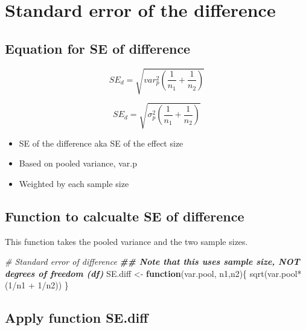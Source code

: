 \documentclass[
]{book}
\newenvironment{Shaded}{\begin{snugshade}}{\end{snugshade}}
\newcommand{\CommentTok}[1]{\textcolor[rgb]{0.56,0.35,0.01}{\textit{#1}}}
\newcommand{\ControlFlowTok}[1]{\textcolor[rgb]{0.13,0.29,0.53}{\textbf{#1}}}
\newcommand{\DecValTok}[1]{\textcolor[rgb]{0.00,0.00,0.81}{#1}}
\newcommand{\DocumentationTok}[1]{\textcolor[rgb]{0.56,0.35,0.01}{\textbf{\textit{#1}}}}
\newcommand{\FunctionTok}[1]{\textcolor[rgb]{0.00,0.00,0.00}{#1}}
\newcommand{\NormalTok}[1]{#1}
\newcommand{\OtherTok}[1]{\textcolor[rgb]{0.56,0.35,0.01}{#1}}
\newcommand{\SpecialCharTok}[1]{\textcolor[rgb]{0.00,0.00,0.00}{#1}}
\providecommand{\tightlist}{%
  \setlength{\itemsep}{0pt}\setlength{\parskip}{0pt}}
\begin{document}
\hypertarget{standard-error-of-the-difference-1}{%
\chapter{Standard error of the difference}\label{standard-error-of-the-difference-1}}

\hypertarget{equation-for-se-of-difference}{%
\section{Equation for SE of difference}\label{equation-for-se-of-difference}}

\[SE_d = \sqrt{{var^2_p}(\frac{1}{n_1} + \frac{1}{n_2})} \]

\[SE_d = \sqrt{{\sigma_p^2}(\frac{1}{n_1} + \frac{1}{n_2})} \]

\begin{itemize}
\tightlist
\item
  SE of the difference aka SE of the effect size
\item
  Based on pooled variance, var.p
\item
  Weighted by each sample size
\end{itemize}

\hypertarget{function-to-calcualte-se-of-difference}{%
\section{Function to calcualte SE of difference}\label{function-to-calcualte-se-of-difference}}

This function takes the pooled variance and the two sample sizes.

\begin{Shaded}
\begin{Highlighting}[]
\CommentTok{\# Standard error of difference}
\DocumentationTok{\#\# Note that this uses sample size, NOT degrees of freedom (df)}
\NormalTok{SE.diff }\OtherTok{\textless{}{-}} \ControlFlowTok{function}\NormalTok{(var.pool, n1,n2)\{}
  \FunctionTok{sqrt}\NormalTok{(var.pool}\SpecialCharTok{*}\NormalTok{(}\DecValTok{1}\SpecialCharTok{/}\NormalTok{n1 }\SpecialCharTok{+} \DecValTok{1}\SpecialCharTok{/}\NormalTok{n2))}
\NormalTok{\}}
\end{Highlighting}
\end{Shaded}

\hypertarget{apply-function-se.diff}{%
\section{Apply function SE.diff}\label{apply-function-se.diff}}
\end{document}
